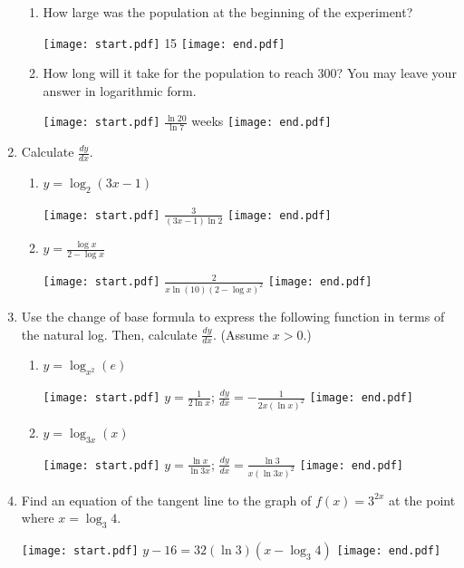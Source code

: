 \documentclass[12pt]{article}
\begin{document}
\begin{enumerate}
\begin{enumerate}

\item How large was the population at the beginning of the experiment?

\texttt{[image: start.pdf]}
{15}
\texttt{[image: end.pdf]}


\item How long will it take for the population to reach 300?  You may leave your answer in logarithmic form.

\texttt{[image: start.pdf]}
{$\displaystyle \frac{\ln{20}}{\ln{7}}$ weeks}
\texttt{[image: end.pdf]}


\end{enumerate}

\newpage

\item Calculate $\frac{dy}{dx}$.

\begin{enumerate}

\item $y = \log_{2}{(3x-1)}$ 

\texttt{[image: start.pdf]}
{{$\frac{3}{(3x-1)\ln2}$}}
\texttt{[image: end.pdf]}


\item $y=\frac{\log{x}}{2-\log{x}}$

\texttt{[image: start.pdf]}
{{$\frac{2}{x\ln{(10)}(2-\log{x})^2}$}}
\texttt{[image: end.pdf]}


\end{enumerate}

\item Use the change of base formula to express the following function in terms of the natural log.  Then, calculate $\frac{dy}{dx}$.  (Assume $x>0$.)

\begin{enumerate}

\item $y=\log_{x^2}{(e)}$

\texttt{[image: start.pdf]}
{{$y=\frac{1}{2\ln{x}}$; $\frac{dy}{dx}=-\frac{1}{2x(\ln{x})^2}$}}
\texttt{[image: end.pdf]}


\item $y = \log_{3x}{(x)}$ 

\texttt{[image: start.pdf]}
{{$y=\frac{\ln{x}}{\ln{3x}} $; $\frac{dy}{dx}=\frac{\ln{3}}{x(\ln{3x})^2}$}}
\texttt{[image: end.pdf]}


\end{enumerate}

\item Find an equation of the tangent line to the graph of $f(x)=3^{2x}$ at the point where $x=\log_3{4}$.

\texttt{[image: start.pdf]}
{$y-16=32(\ln{3})(x-\log_{3}4)$}
\texttt{[image: end.pdf]}


\end{enumerate}
\end{document}
